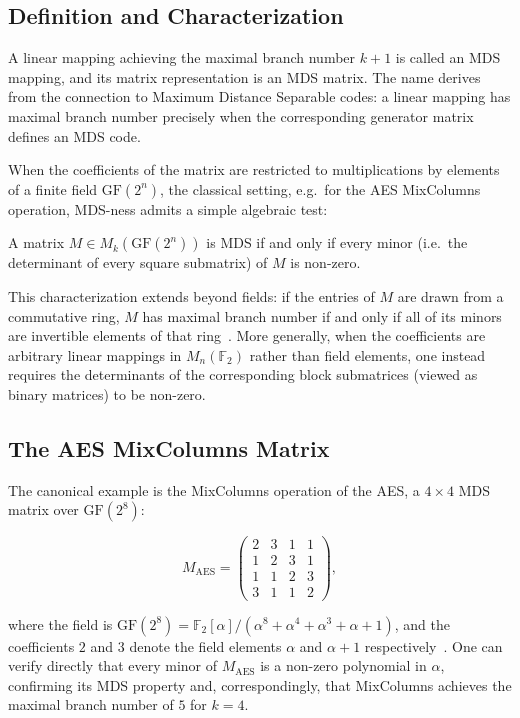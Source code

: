 \subsection{Definition and Characterization}

A linear mapping achieving the maximal branch number $k+1$ is called an
MDS mapping, and its matrix representation is an MDS matrix. The
name derives from the connection to Maximum Distance Separable codes: a linear
mapping has maximal branch number precisely when the corresponding generator
matrix defines an MDS code.

When the coefficients of the matrix are restricted to multiplications by
elements of a finite field $\mathrm{GF}(2^n)$, the classical setting, e.g.\ for
the AES MixColumns operation, MDS-ness admits a simple algebraic test:

\begin{proposition}
A matrix $M \in M_k(\mathrm{GF}(2^n))$ is MDS if and only if every minor
(i.e.\ the determinant of every square submatrix) of $M$ is non-zero.
\end{proposition}

This characterization extends beyond fields: if the entries of $M$ are drawn
from a commutative ring, $M$ has maximal branch number if and only if all of
its minors are invertible elements of that ring~\cite{augot2013exhaustive}. More generally,
when the coefficients are arbitrary linear mappings in $M_n(\mathbb{F}_2)$
rather than field elements, one instead requires the determinants of the
corresponding block submatrices (viewed as binary matrices) to be non-zero.

\subsection{The AES MixColumns Matrix}

The canonical example is the MixColumns operation of the AES, a $4\times 4$ MDS
matrix over $\mathrm{GF}(2^8)$:

\begin{equation}
M_{\mathrm{AES}} =
\begin{pmatrix}
2 & 3 & 1 & 1 \\
1 & 2 & 3 & 1 \\
1 & 1 & 2 & 3 \\
3 & 1 & 1 & 2
\end{pmatrix},
\end{equation}

where the field is $\mathrm{GF}(2^8) = \mathbb{F}_2[\alpha]/(\alpha^8 + \alpha^4 +
\alpha^3 + \alpha + 1)$, and the coefficients $2$ and $3$ denote the field
elements $\alpha$ and $\alpha+1$ respectively~\cite{daemen2002design}. One can verify
directly that every minor of $M_{\mathrm{AES}}$ is a non-zero polynomial in
$\alpha$, confirming its MDS property and, correspondingly, that MixColumns
achieves the maximal branch number of $5$ for $k=4$.

